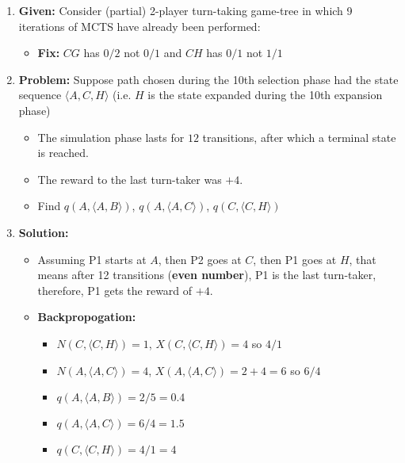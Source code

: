 \begin{example}
    \begin{enumerate}
        \item \textbf{Given:} Consider (partial) 2-player turn-taking game-tree in which 9 iterations of MCTS have already been performed: 
        \begin{itemize}
            \item \textbf{Fix:} $CG$ has $0/2$ not $0/1$ and $CH$ has $0/1$ not $1/1$
        \end{itemize}
        \item \textbf{Problem:} Suppose path chosen during the 10th selection phase had the state sequence $\langle A,C,H \rangle$ (i.e. $H$ is the state expanded during the 10th expansion phase)
        \begin{itemize}
            \item The simulation phase lasts for $12$ transitions, after which a terminal state is reached. 
            \item The reward to the last turn-taker was $+4$.
            \item Find $q(A,\langle A,B \rangle)$, $q(A,\langle A,C \rangle)$, $q(C,\langle C,H \rangle)$
        \end{itemize}
        \item \textbf{Solution:}
        \begin{itemize}
            \item Assuming P1 starts at $A$, then P2 goes at $C$, then P1 goes at $H$, that means after 12 transitions (\textbf{even number}), P1 is the last turn-taker, therefore, P1 gets the reward of $+4$.
            \item \textbf{Backpropogation:}
            \begin{itemize}
                \item $N(C,\langle C,H \rangle) = 1$, $X(C,\langle C,H \rangle) = 4$ so $4/1$
                \item $N(A,\langle A,C \rangle) = 4$, $X(A,\langle A,C \rangle) = 2+4=6$ so $6/4$
                \item $q(A,\langle A,B \rangle) = 2/5 = 0.4$
                \item $q(A,\langle A,C \rangle) = 6/4 = 1.5$
                \item $q(C,\langle C,H \rangle) = 4/1 = 4$
            \end{itemize}
        \end{itemize}
    \end{enumerate}
\end{example}